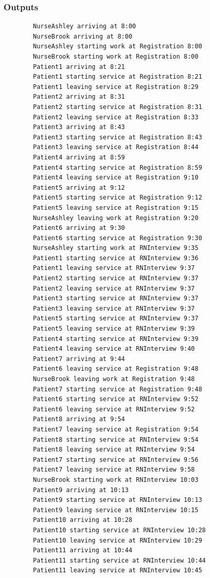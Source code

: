 \documentclass[12pt]{article}
\begin{document}
		\subsubsection{Outputs}
		\begin{verbatim}
		NurseAshley arriving at 8:00
		NurseBrook arriving at 8:00
		NurseAshley starting work at Registration 8:00
		NurseBrook starting work at Registration 8:00
		Patient1 arriving at 8:21
		Patient1 starting service at Registration 8:21
		Patient1 leaving service at Registration 8:29
		Patient2 arriving at 8:31
		Patient2 starting service at Registration 8:31
		Patient2 leaving service at Registration 8:33
		Patient3 arriving at 8:43
		Patient3 starting service at Registration 8:43
		Patient3 leaving service at Registration 8:44
		Patient4 arriving at 8:59
		Patient4 starting service at Registration 8:59
		Patient4 leaving service at Registration 9:10
		Patient5 arriving at 9:12
		Patient5 starting service at Registration 9:12
		Patient5 leaving service at Registration 9:15
		NurseAshley leaving work at Registration 9:20
		Patient6 arriving at 9:30
		Patient6 starting service at Registration 9:30
		NurseAshley starting work at RNInterview 9:35
		Patient1 starting service at RNInterview 9:36
		Patient1 leaving service at RNInterview 9:37
		Patient2 starting service at RNInterview 9:37
		Patient2 leaving service at RNInterview 9:37
		Patient3 starting service at RNInterview 9:37
		Patient3 leaving service at RNInterview 9:37
		Patient5 starting service at RNInterview 9:37
		Patient5 leaving service at RNInterview 9:39
		Patient4 starting service at RNInterview 9:39
		Patient4 leaving service at RNInterview 9:40
		Patient7 arriving at 9:44
		Patient6 leaving service at Registration 9:48
		NurseBrook leaving work at Registration 9:48
		Patient7 starting service at Registration 9:48
		Patient6 starting service at RNInterview 9:52
		Patient6 leaving service at RNInterview 9:52
		Patient8 arriving at 9:54
		Patient7 leaving service at Registration 9:54
		Patient8 starting service at RNInterview 9:54
		Patient8 leaving service at RNInterview 9:54
		Patient7 starting service at RNInterview 9:56
		Patient7 leaving service at RNInterview 9:58
		NurseBrook starting work at RNInterview 10:03
		Patient9 arriving at 10:13
		Patient9 starting service at RNInterview 10:13
		Patient9 leaving service at RNInterview 10:15
		Patient10 arriving at 10:28
		Patient10 starting service at RNInterview 10:28
		Patient10 leaving service at RNInterview 10:29
		Patient11 arriving at 10:44
		Patient11 starting service at RNInterview 10:44
		Patient11 leaving service at RNInterview 10:45

\end{verbatim}
\end{document}
